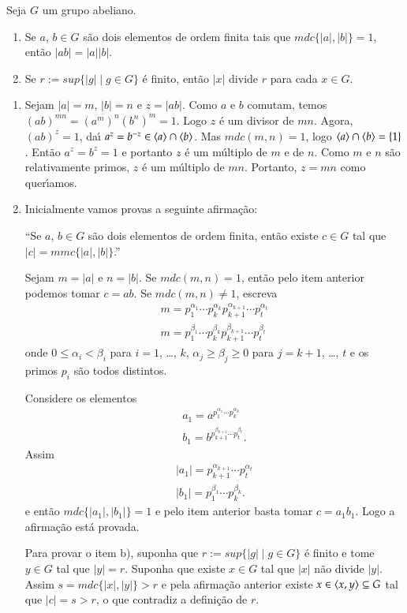 \begin{proposicao}
	Seja $G$ um grupo abeliano.
	\begin{enumerate}[label=({\roman*})]
		\item Se $a$, $b \in G$ s\~ao dois elementos de ordem finita tais que $mdc\{|a|, |b|\} = 1$, ent\~ao $|ab| = |a||b|$.
		\item Se $r:= sup\{|g| \mid g \in G\}$ \'e finito, ent\~ao $|x|$ divide $r$ para cada $x \in G$.
	\end{enumerate}
\end{proposicao}
\begin{prova}
	\begin{enumerate}[label=({\roman*})]
		\item Sejam $|a| = m$, $|b| = n$ e $z = |ab|$. Como $a$ e $b$ comutam, temos $(ab)^{mn} = (a^m)^n(b^n)^m = 1$. Logo $z$ \'e um divisor de $mn$. Agora, $(ab)^z = 1$, da{\'\i} $a^z = b^{-z} \in \langle{a}\rangle\cap\langle{b}\rangle$. Mas $mdc(m,n) = 1$, logo $\langle{a}\rangle\cap\langle{b}\rangle = \{1\}$. Ent\~ao $a^z = b^z = 1$ e portanto $z$ \'e um m\'ultiplo de $m$ e de $n$. Como $m$ e $n$ s\~ao relativamente primos, $z$ \'e um m\'ultiplo de $mn$. Portanto, $z = mn$ como quer{\'\i}amos.
		\item Inicialmente vamos provas a seguinte afirma\c{c}\~ao:

		``Se $a$, $b \in G$ s\~ao dois elementos de ordem finita, ent\~ao existe $c \in G$ tal que $|c| = mmc\{|a|, |b|\}$.''

		Sejam $m = |a|$ e $n = |b|$. Se $mdc(m, n) = 1$, ent\~ao pelo item anterior podemos tomar $c = ab$. Se $mdc(m, n) \ne 1$, escreva
		\begin{align*}
			m = p_1^{\alpha_1}\cdots p_k^{\alpha_k}p_{k + 1}^{\alpha_{k + 1}}\cdots p_t^{\alpha_t}\\
			m = p_1^{\beta_1}\cdots p_k^{\beta_k}p_{k + 1}^{\beta_{k + 1}}\cdots p_t^{\beta_t}
		\end{align*}
		onde $0 \le \alpha_i < \beta_i$ para $i = 1$, \dots, $k$, $\alpha_j \ge \beta_j \ge 0$ para $j = k + 1$, \dots, $t$ e os primos $p_i$ s\~ao todos distintos.

		Considere os elementos
		\begin{align*}
			a_1 = a^{p_1^{\alpha_1}\cdots p_k^{\alpha_k}}\\
			b_1 = b^{p_{k + 1}^{\beta_{k + 1}}\cdots p_t^{\beta_t}}.
		\end{align*}
		Assim
		\begin{align*}
			|a_1| = p_{k + 1}^{\alpha_{k + 1}}\cdots p_t^{\alpha_t}\\
			|b_1| = p_1^{\beta_1}\cdots p_k^{\beta_k}.
		\end{align*}
		e ent\~ao $mdc\{|a_1|, |b_1|\} = 1$  e pelo item anterior basta tomar $c = a_1b_1$. Logo a afirma\c{c}\~ao est\'a provada.

		Para provar o item b), suponha que $r := sup\{|g| \mid g \in G\}$ \'e finito e tome $y \in G$ tal que $|y| = r$. Suponha que existe $x \in G$ tal que $|x|$ n\~ao divide $|y|$. Assim $s = mdc\{|x|, |y|\} > r$ e pela afirma\c{c}\~ao anterior existe $x \in \langle{x, y}\rangle \subseteq G$ tal que $|c| = s > r$, o que contradiz a defini\c{c}\~ao de $r$.
	\end{enumerate}
\end{prova}

